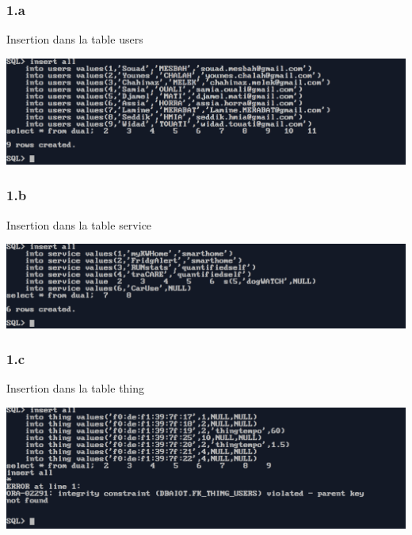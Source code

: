 \subsubsection*{1.a}
Insertion dans la table users 



\begin{center}
    \includegraphics[width=\textwidth]{ScreenShot/Partie3/users.png}
\end{center}

\vspace{0.25cm}
\subsubsection*{1.b}
Insertion dans la table service



\begin{center}
    \includegraphics[width=\textwidth]{ScreenShot/Partie3/service.png}
\end{center}

\vspace{0.25cm}
\subsubsection*{1.c}
Insertion dans la table thing 



\begin{center}
    \includegraphics[width=\textwidth]{ScreenShot/Partie3/thing.png}
\end{center}

